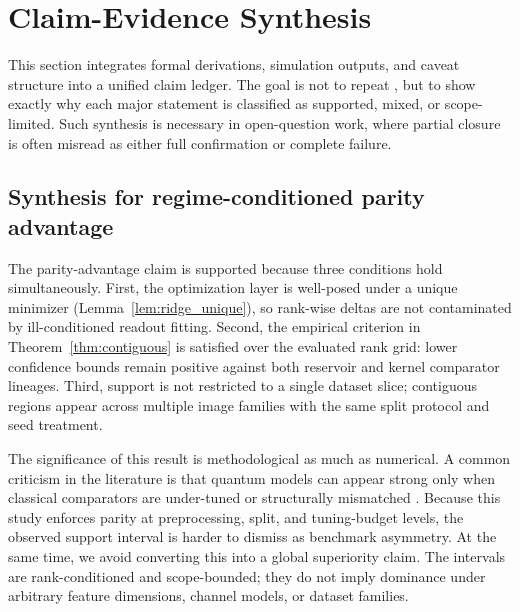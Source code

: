 \begin{table}[t]
\caption{Bound-audit summary for non-entangling kernel emulation. Reported columns connect observed deltas, kernel error estimates, and normalized bound ratios used in the kernel-null test. The table provides direct numerical evidence for the supported status of this bounded claim and makes the caveat structure explicit for adaptive extensions.}
\label{tab:cf3}
\centering
\small
\renewcommand{\arraystretch}{1.1}
\setlength{\tabcolsep}{4pt}
\resizebox{\linewidth}{!}{}
\end{table}

\section{Claim-Evidence Synthesis}\label{sec:claim_evidence}
This section integrates formal derivations, simulation outputs, and caveat structure into a unified claim ledger. The goal is not to repeat , but to show exactly why each major statement is classified as supported, mixed, or scope-limited. Such synthesis is necessary in open-question work, where partial closure is often misread as either full confirmation or complete failure.

\subsection{Synthesis for regime-conditioned parity advantage}
The parity-advantage claim is supported because three conditions hold simultaneously. First, the optimization layer is well-posed under a unique minimizer (Lemma~\ref{lem:ridge_unique}), so rank-wise deltas are not contaminated by ill-conditioned readout fitting. Second, the empirical criterion in Theorem~\ref{thm:contiguous} is satisfied over the evaluated rank grid: lower confidence bounds remain positive against both reservoir and kernel comparator lineages. Third, support is not restricted to a single dataset slice; contiguous regions appear across multiple image families with the same split protocol and seed treatment.

The significance of this result is methodological as much as numerical. A common criticism in the literature is that quantum models can appear strong only when classical comparators are under-tuned or structurally mismatched \citep{S006,S020,S035}. Because this study enforces parity at preprocessing, split, and tuning-budget levels, the observed support interval is harder to dismiss as benchmark asymmetry. At the same time, we avoid converting this into a global superiority claim. The intervals are rank-conditioned and scope-bounded; they do not imply dominance under arbitrary feature dimensions, channel models, or dataset families.


